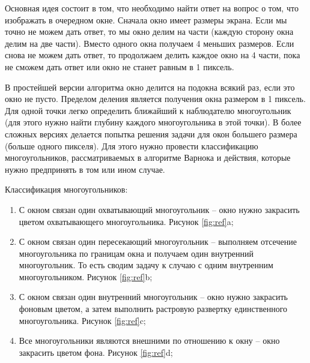 Основная идея состоит в том, что необходимо найти ответ на вопрос о том, что изображать в очередном окне. Сначала окно имеет размеры экрана. Если мы точно не можем дать ответ, то мы окно делим на части (каждую сторону окна делим на две части). Вместо одного окна получаем 4 меньших размеров. Если снова не можем дать ответ, то продолжаем делить каждое окно на 4 части, пока не сможем дать ответ или окно не станет равным в 1 пиксель.

В простейшей версии алгоритма окно делится на подокна всякий раз, если это окно не пусто. Пределом деления является получения окна размером в 1 пиксель. Для одной точки легко определить ближайший к наблюдателю многоугольник (для этого нужно найти глубину каждого многоугольника в этой точки). В более сложных версиях делается попытка решения задачи для окон большего размера (больше одного пикселя). Для этого нужно провести классификацию многоугольников, рассматриваемых в алгоритме Варнока и действия, которые нужно предпринять в том или ином случае.

Классификация многоугольников:

\begin{enumerate}
	\item С окном связан один охватывающий многоугольник -- окно нужно закрасить цветом охватывающего многоугольника.  Рисунок \ref{fig:ref}a;
	\item С окном связан один пересекающий многоугольник -- выполняем отсечение многоугольника по границам окна и получаем один внутренний многоугольник. То есть сводим задачу к случаю с одним внутренним многоугольником.  Рисунок \ref{fig:ref}b;
	\item С окном связан один внутренний многоугольник -- окно нужно закрасить фоновым цветом, а затем выполнить растровую развертку единственного многоугольника. Рисунок \ref{fig:ref}c;
	\item Все многоугольники являются внешними по отношению к окну -- окно закрасить цветом фона.  Рисунок \ref{fig:ref}d;
\end{enumerate}

\begin{figure}[ht!]

\end{figure}

